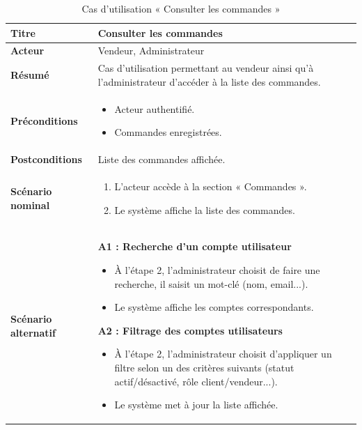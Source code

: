 \begin{table}[H]
\centering
\renewcommand{\arraystretch}{1.4}
\begin{tabular}{|p{4cm}|p{10cm}|}
\hline
\textbf{Titre} & Consulter les commandes \\
\hline
\textbf{Acteur} & Vendeur, Administrateur \\
\hline
\textbf{Résumé} & Cas d'utilisation permettant au vendeur ainsi qu'à l'administrateur d'accéder à la liste des commandes. \\
\hline
\textbf{Préconditions} &
\vspace{-12pt}
\begin{itemize}
    \item Acteur authentifié.
    \item Commandes enregistrées.
\end{itemize} \\
\hline
\textbf{Postconditions} & Liste des commandes affichée. \\
\hline
\textbf{Scénario nominal} &
\vspace{-12pt}
\begin{enumerate}
    \item L'acteur accède à la section « Commandes ».
    \item Le système affiche la liste des commandes.
\end{enumerate} \\
\hline
\textbf{Scénario alternatif} &
\vspace{-12pt}
\textbf{A1 : Recherche d'un compte utilisateur}
\begin{itemize}
    \item À l'étape 2, l'administrateur choisit de faire une recherche, il saisit un mot-clé (nom, email...).
    \item Le système affiche les comptes correspondants.
\end{itemize}

\textbf{A2 : Filtrage des comptes utilisateurs}
\begin{itemize}
    \item À l'étape 2, l'administrateur choisit d'appliquer un filtre selon un des critères suivants (statut actif/désactivé, rôle client/vendeur...).
    \item Le système met à jour la liste affichée.
\end{itemize} \\
\hline
\end{tabular}
\caption{Cas d'utilisation « Consulter les commandes »}
\label{tableau 6}
\end{table}

